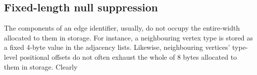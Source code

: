 \subsection{Fixed-length null suppression}

The components of an edge identifier, usually, do not occupy the entire-width allocated to them in storage. For instance, a neighbouring vertex type is stored as a fixed 4-byte value in the adjacency lists. Likewise, neighbouring vertices' type-level positional offsets do not often exhaust the whole of 8 bytes allocated to them in storage. Clearly 

